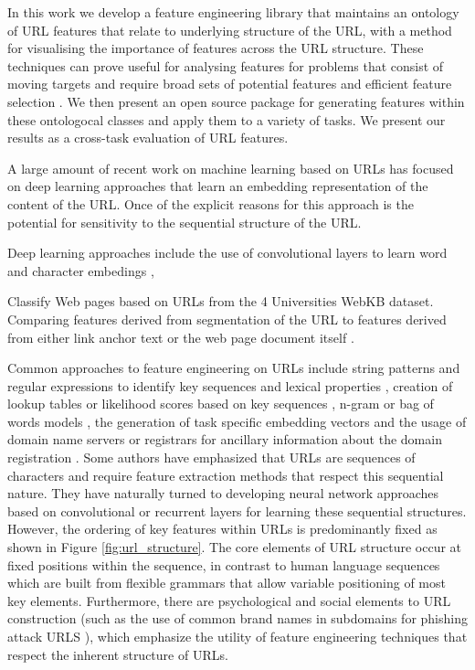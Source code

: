 \documentclass[sigconf]{acmart}
\begin{document}
In this work we develop a feature engineering library that maintains an ontology of URL features 
that relate to underlying structure of the URL, with a method for visualising the importance of features
across the URL structure. These techniques can prove useful for analysing features for problems that
consist of moving targets and require broad sets of potential features and efficient feature selection \cite{Basnet2012}. 
We then present an open source package for generating features within these
ontologocal classes and apply them to a variety of tasks. We present our results as a
cross-task evaluation of URL features.  
 
A large amount of recent work on machine learning based on URLs has focused on deep learning approaches that
learn an embedding representation of the content of the URL. Once of the explicit reasons 
for this approach is the potential for sensitivity to the sequential structure of the URL.
\cite{Le2018}

Deep learning approaches include the use of convolutional layers to learn word and character 
embedings \cite{Le2018},

\cite{Ayes2019}
\cite{Li2020}
\cite{Baykan2009}
\cite{Kan2005}
\cite{Hernandez2012}
\cite{Chung2010}
\cite{Qiu2020}
\cite{Xu2021}
\cite{Rhea2022}
\cite{Ma2009}
\cite{Verma2017}
\cite{Sountharrajan2020}
\cite{Murthy2022}

Classify Web pages based on URLs from the 4 Universities WebKB dataset. Comparing features derived from segmentation
of the URL to features derived from either link anchor text or the web page document itself \cite{Kan2004}.

Common approaches to feature engineering on URLs include string patterns and regular expressions to
identify key sequences and lexical properties \cite{Kan2004,Mamun2016,Tupsamudre2019}, 
creation of lookup tables or likelihood scores based on key sequences
\cite{Meshkizadeh2010}, n-gram or bag of words models \cite{Baykan2009}, 
the generation of task specific embedding vectors\cite{Le2018,Qiu2020} and the
usage of domain name servers or registrars for ancillary information about the domain registration \cite{Canali2011}. 
Some authors have 
emphasized that URLs are sequences of characters and require feature extraction methods that respect 
this sequential nature\cite{Le2018,Vazhayil2018}. They have naturally turned to developing neural network approaches
based on convolutional or recurrent layers for learning these sequential structures.
However, the ordering of key features within URLs is predominantly fixed as shown in Figure \ref{fig:url_structure}.
The core elements of URL structure occur at fixed positions within the sequence, in contrast to human language
sequences which are built from flexible grammars that allow variable positioning of most key elements. Furthermore,
there are psychological and social elements to URL construction (such as the use of common brand names in subdomains
for phishing attack URLS \cite{Tupsamudre2019}), which emphasize the utility of feature engineering techniques that
respect the inherent structure of URLs.
\end{document}
